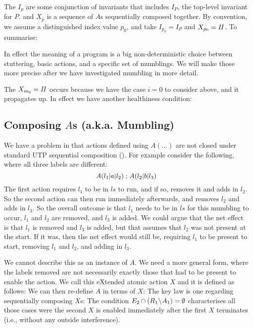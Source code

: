 The $I_p$ are some conjunction of invariants
that includes $I_P$, the top-level invariant for $P$.
and $X_p$ is a sequence of $A$s sequentially composed together.
By convention, we assume a distinguished index value $p_0$,
and take $I_{p_0} = I_P$ and $X_{p_0} = \mathit{II}$.
To summarise:

In effect the meaning of a program is a big non-deterministic choice
between stuttering, basic actions,
and a specific set of mumblings.
We will make those more precise after we have investigated mumbling in more detail.

The $X_{m_0} =\mathit{II}$ occurs because we have the case $i=0$ to consider above,
and it propagates up.
In effect we have another healthiness condition:


\subsection{Composing $A$s (a.k.a. Mumbling)}\label{ssec:comp-A}

We have a problem in that actions defined using $A(\dots)$
are not closed under standard UTP sequential composition ().
For example consider the following,
where all three labels are different:
\[
   A(l_1|a|l_2) \mathrel{;} A(l_2|b|l_3)
\]
The first action requires $l_1$ to be in $ls$ to run,
and if so, removes it and adds in $l_2$.
So the second action can then run immediately afterwards,
and removes $l_2$ and adds in $l_3$.
So the overall outcome is that $l_1$ needs to be in $ls$
for this mumbling to occur, $l_1$ and $l_2$ are removed,
and $l_3$ is added.
We could argue that the net effect is that $l_1$
is removed and $l_3$ is added,
but that assumes that $l_2$ was not present at the start.
If it was, then the net effect would still be,
requiring $l_1$ to be present to start,
removing $l_1$ and $l_2$, and adding in $l_3$.

We cannot describe this as an instance of $A$.
We need a more general form,
where the labels removed are not necessarily
exactly those that had to be present to enable the action.
We call this eXtended atomic action $X$ and it is defined as follows:
We can then re-define $A$ in terms of $X$:
The key law is one regarding sequentially composing $X$s:
The condition $E_2 \cap (R_1\!\setminus\! A_1) = \emptyset$
characterises all those cases were the second $X$ is enabled
immediately after the first $X$ terminates
(i.e., without any outside interference).


